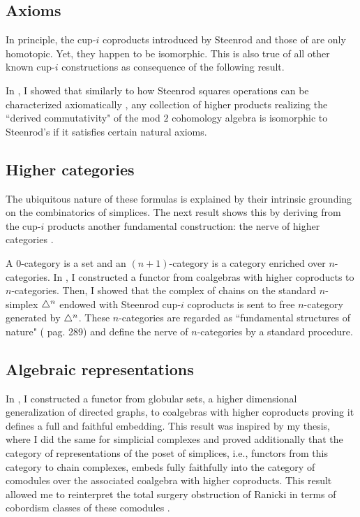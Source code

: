 \subsection{Axioms}

In principle, the cup-$i$ coproducts introduced by Steenrod \cite{steenrod1947products} and those of \cite{medina2021newformulas} are only homotopic.
Yet, they happen to be isomorphic.
This is also true of all other known cup-$i$ constructions \cite{gonzalez-diaz1999steenrod, mcclure2003multivariable, berger2004combinatorial, medina2020prop1} as consequence of the following result.

In \cite{medina2018axiomatic}, I showed that similarly to how Steenrod squares operations can be characterized axiomatically \cite{steenrod1962cohomology}, any collection of higher products realizing the ``derived commutativity" of the mod $2$ cohomology algebra is isomorphic to Steenrod's if it satisfies certain natural axioms.

\subsection{Higher categories}

The ubiquitous nature of these formulas is explained by their intrinsic grounding on the combinatorics of simplices.
The next result shows this by deriving from the cup-$i$ products another fundamental construction: the nerve of higher categories \cite{street1987orientals}.

A $0$-category is a set and an $(n+1)$-category is a category enriched over $n$-categories.
In \cite{medina2020globular}, I constructed a functor from coalgebras with higher coproducts to $n$-categories.
Then, I showed that the complex of chains on the standard $n$-simplex $\triangle^n$ endowed with Steenrod cup-$i$ coproducts is sent to free $n$-category generated by $\triangle^n$.
These $n$-categories are regarded as ``fundamental structures of nature" (\cite{street1987orientals} pag. 289) and define the nerve of $n$-categories by a standard procedure.

\subsection{Algebraic representations}

In \cite{medina2020globular}, I constructed a functor from globular sets, a higher dimensional generalization of directed graphs, to coalgebras with higher coproducts proving it defines a full and faithful embedding.
This result was inspired by my thesis, where I did the same for simplicial complexes and proved additionally that the category of representations of the poset of simplices, i.e., functors from this category to chain complexes, embeds fully faithfully into the category of comodules over the associated coalgebra with higher coproducts.
This result allowed me to reinterpret the total surgery obstruction of Ranicki \cite{ranicki1992topological} in terms of cobordism classes of these comodules \cite{medina2015thesis}.

